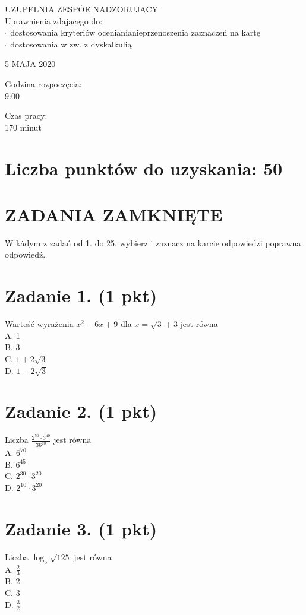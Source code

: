 \documentclass[10pt]{article}
\begin{document}
UZUPELNIA ZESPÓE NADZORUJĄCY\\
Uprawnienia zdającego do:\\
\(\square\) dostosowania kryteriów ocenianianieprzenoszenia zaznaczeń na kartę\\
\(\square\) dostosowania w zw. z dyskalkulią

5 MAJA 2020

Godzina rozpoczęcia:\\
9:00

Czas pracy:\\
170 minut

\section*{Liczba punktów do uzyskania: 50}
\section*{ZADANIA ZAMKNIĘTE}
W kȧ̇dym z zadań od 1. do 25. wybierz i zaznacz na karcie odpowiedzi poprawna odpowiedź.

\section*{Zadanie 1. (1 pkt)}
Wartość wyrażenia \(x^{2}-6 x+9\) dla \(x=\sqrt{3}+3\) jest równa\\
A. 1\\
B. 3\\
C. \(1+2 \sqrt{3}\)\\
D. \(1-2 \sqrt{3}\)

\section*{Zadanie 2. (1 pkt)}
Liczba \(\frac{2^{50} \cdot 3^{40}}{36^{10}}\) jest równa\\
A. \(6^{70}\)\\
B. \(6^{45}\)\\
C. \(2^{30} \cdot 3^{20}\)\\
D. \(2^{10} \cdot 3^{20}\)

\section*{Zadanie 3. (1 pkt)}
Liczba \(\log _{5} \sqrt{125}\) jest równa\\
A. \(\frac{2}{3}\)\\
B. 2\\
C. 3\\
D. \(\frac{3}{2}\)
\end{document}
